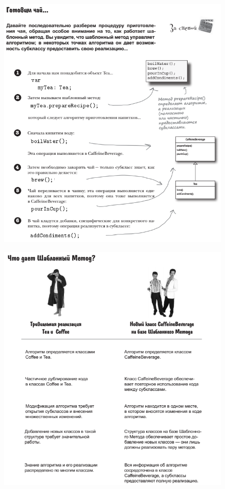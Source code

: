 \documentclass{beamer}
\begin{document}
\begin{frame}
\begin{figure}[h]
\centering
\includegraphics[scale=0.45]{images/lec12-pic11.png}
\label{pic-sort}
\end{figure}
\end{frame}

\begin{frame}
\begin{figure}[h]
\centering
\includegraphics[scale=0.5]{images/lec12-pic12.png}
\label{pic-sort}
\end{figure}
\end{frame}
\end{document}
